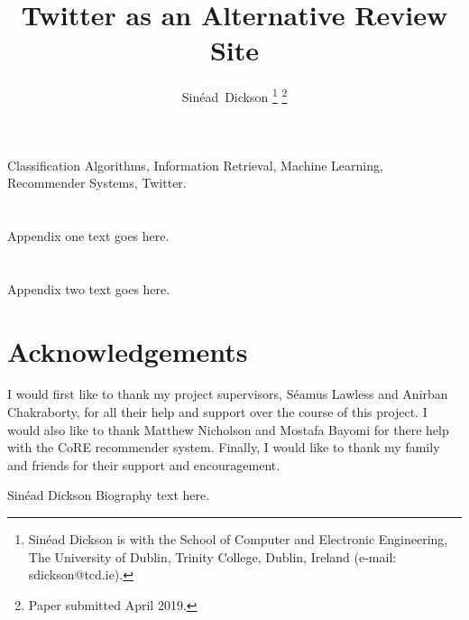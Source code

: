 \documentclass[journal]{IEEEtran}
\begin{document}
\title{Twitter as an Alternative Review Site}

\author{Sin\'ead~Dickson
\thanks{Sin\'ead Dickson is with the School of Computer and Electronic Engineering, The University of Dublin, Trinity College, Dublin, Ireland (e-mail: sdickson@tcd.ie).}
\thanks{Paper submitted April 2019.}}

\maketitle



\begin{IEEEkeywords}
Classification Algorithms, Information Retrieval, Machine Learning, Recommender Systems, Twitter.
\end{IEEEkeywords}







\appendices
\section{}
Appendix one text goes here.

\section{}
Appendix two text goes here.

\section*{Acknowledgements}
I would first like to thank my project supervisors, S\'eamus Lawless and Anirban Chakraborty, for all their help and support over the course of this project. 
I would also like to thank Matthew Nicholson and Mostafa Bayomi for there help with the CoRE recommender system.
Finally, I would like to thank my family and friends for their support and encouragement.




\begin{IEEEbiography}{Sin\'ead Dickson}
Biography text here.
\end{IEEEbiography}
\end{document}

